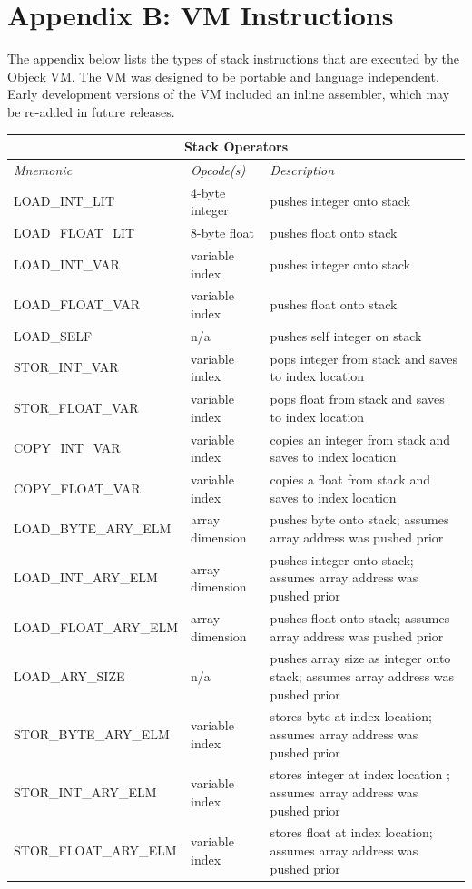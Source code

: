 \documentclass[12pt]{article}
\begin{document}
\section{Appendix B: VM Instructions}
The appendix below lists the types of stack instructions that are executed by the Objeck VM.  The VM was designed to be portable and language independent.  Early development versions of the VM included an inline assembler, which may be re-added in future releases.

\begin{center}
{\small{
\begin{tabular}{| l | l | p{6 cm} |}
\hline
\multicolumn{3}{|c|}{\textbf{Stack Operators}} \\
\hline
\emph{Mnemonic}  &  \emph{Opcode(s)}  &  \emph{Description} \\ \hline \hline
LOAD\_INT\_LIT & 4-byte integer & pushes integer onto stack  \\ \hline
LOAD\_FLOAT\_LIT & 8-byte float & pushes float onto stack \\ \hline
LOAD\_INT\_VAR & variable index & pushes integer onto stack \\ \hline
LOAD\_FLOAT\_VAR & variable index & pushes float onto stack \\ \hline
LOAD\_SELF & n/a & pushes self integer on stack \\ \hline
STOR\_INT\_VAR & variable index & pops integer from stack and saves to index location \\ \hline
STOR\_FLOAT\_VAR & variable index & pops float from stack and saves to index location \\ \hline
COPY\_INT\_VAR & variable index & copies an integer from stack and saves to index location \\ \hline
COPY\_FLOAT\_VAR & variable index & copies a float from stack and saves to index location \\ \hline
LOAD\_BYTE\_ARY\_ELM & array dimension & pushes byte onto stack; assumes array address was pushed prior \\ \hline
LOAD\_INT\_ARY\_ELM & array dimension & pushes integer onto stack; assumes array address was pushed prior \\ \hline
LOAD\_FLOAT\_ARY\_ELM & array dimension & pushes float onto stack; assumes array address was pushed prior \\ \hline
LOAD\_ARY\_SIZE & n/a & pushes array size as integer onto stack; assumes array address was pushed prior \\ \hline
STOR\_BYTE\_ARY\_ELM & variable index & stores byte at index location; assumes array address was pushed prior \\ \hline
STOR\_INT\_ARY\_ELM & variable index & stores integer at index location ; assumes array address was pushed prior \\ \hline
STOR\_FLOAT\_ARY\_ELM & variable index & stores float at index location; assumes array address was pushed prior \\ \hline
\end{tabular}

}}
\end{center}
\end{document}
